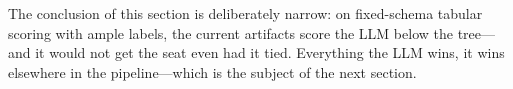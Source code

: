 The conclusion of this section is deliberately narrow: on fixed-schema tabular
scoring with ample labels, the current artifacts score the LLM below the
tree---and it would not get the seat even had it tied. Everything the LLM wins, it wins elsewhere in the pipeline---which is the
subject of the next section.
